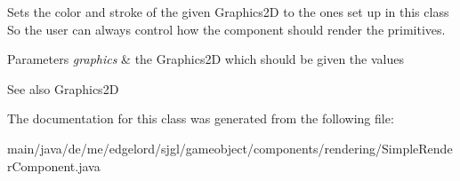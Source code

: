 Sets the color and stroke of the given Graphics2D to the ones set up in this class So the user can always control how the component should render the primitives.


\begin{DoxyParams}{Parameters}
{\em graphics} & the Graphics2D which should be given the values\\
\hline
\end{DoxyParams}
\begin{DoxySeeAlso}{See also}
Graphics2D 
\end{DoxySeeAlso}


The documentation for this class was generated from the following file\+:\begin{DoxyCompactItemize}
\item 
main/java/de/me/edgelord/sjgl/gameobject/components/rendering/Simple\+Render\+Component.\+java\end{DoxyCompactItemize}
